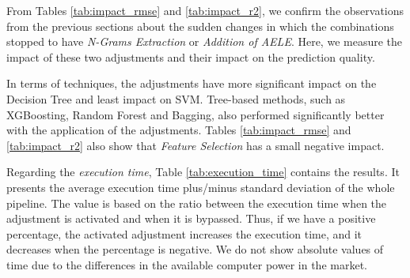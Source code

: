 \begin{table}[htb]

\end{table}



From Tables \ref{tab:impact_rmse} and \ref{tab:impact_r2}, we confirm the observations from the previous sections about the sudden changes in which the combinations stopped to have \textit {N-Grams Extraction} or \textit{Addition of \gls{AELE}}. Here, we measure the impact of these two adjustments and their impact on the prediction quality.

In terms of techniques, the adjustments have more significant impact on the Decision Tree and least impact on \gls{SVM}. Tree-based methods, such as XGBoosting, Random Forest and Bagging, also performed significantly better with the application of the adjustments. 
Tables \ref{tab:impact_rmse} and \ref{tab:impact_r2} also show that \textit{Feature Selection} has a small negative impact.

Regarding the \emph{execution time}, Table \ref{tab:execution_time} contains the results. It presents the average execution time plus/minus standard deviation of the whole pipeline. The value is based on the ratio between the execution time when the adjustment is activated and when it is bypassed. Thus, if we have a positive percentage, the activated adjustment increases the execution time, and it decreases when the percentage is negative. We do not show absolute values of time due to the differences in the available computer power in the market. 

